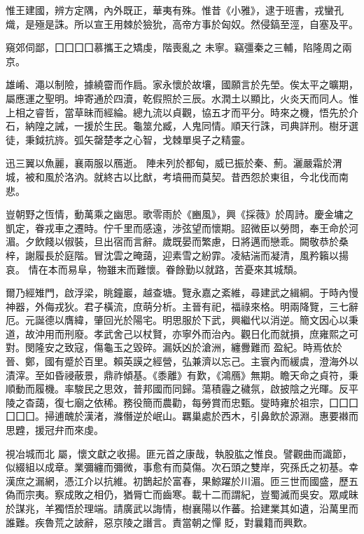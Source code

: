 \begin{pinyinscope}
 惟王建國，辨方定隅，內外既正，華夷有殊。惟昔《小雅》，逮于班書，戎蠻孔熾，是殛是誅。所以宣王用棘於獫狁，高帝方事於匈奴。然侵鎬至涇，自塞及平。



 窺郊伺鄙，囗囗囗囗慕攜王之矯虔，階喪亂之
 未寧。竊彊秦之三輔，陷隆周之兩京。



 雄崤、澠以制險，據繞霤而作扃。家永懷於故壤，國願言於先塋。俟太平之曠期，屬應運之聖明。坤寄通於四瀆，乾假照於三辰。水潤土以顯比，火炎天而同人。惟上相之睿哲，當草昧而經綸。總九流以貞觀，協五才而平分。時來之機，悟先於介石，納隍之誡，一援於生民。龜筮允臧，人鬼同情。順天行誅，司典詳刑。樹牙選徒，秉鉞抗旍。弧矢罄楚孝之心智，戈棘單吳子之精靈。



 迅三翼以魚麗，襄兩服以鴈逝。
 陣未列於都甸，威已振於秦、薊。灑嚴霜於渭城，被和風於洛汭。就終古以比猷，考墳冊而莫契。昔西怨於東徂，今北伐而南悲。



 豈朝野之恆情，動萬乘之幽思。歌零雨於《豳風》，興《採薇》於周詩。慶金墉之凱定，眷戎車之遷時。佇千里而感遠，涉弦望而懷期。詔微臣以勞問，奉王命於河湄。夕飲餞以俶裝，旦出宿而言辭。歲既晏而繁慮，日將邁而戀乖。闕敬恭於桑梓，謝履長於庭階。冒沈雲之晻藹，迎素雪之紛霏。凌結湍而凝清，風矜籟以揚哀。
 情在本而易阜，物雖末而難懷。眷餘勤以就路，苦憂來其城頹。



 爾乃經雉門，啟浮梁，眺鐘巖，越查塘。覽永嘉之紊維，尋建武之緝綱。于時內慢神器，外侮戎狄。君子橫流，庶萌分析。主晉有祀，福祿來格。明兩降覽，三七辭厄。元誕德以膺緯，肇回光於陽宅。明思服於下武，興繼代以消逆。簡文因心以秉道，故沖用而刑廢。孝武舍己以杖賢，亦寧外而治內。觀日化而就損，庶雍熙之可對。閔隆安之致寇，傷龜玉之毀碎。漏妖凶於滄洲，纏釁難而
 盈紀。時焉依於晉、鄭，國有蹙於百里。賴英謨之經營，弘兼濟以忘己。主寰內而緩虞，澄海外以漬滓。至如昏祲蔽景，鼎祚傾基。《黍離》有歎，《鴻鴈》無期。瞻天命之貞符，秉順動而履機。率駿民之思效，普邦國而同歸。蕩積霾之穢氛，啟披陰之光暉。反平陵之杳藹，復七廟之依稀。務役簡而農勸，每勞賞而忠甄。燮時雍於祖宗，囗囗囗囗囗囗。掃逋醜於漢渚，滌僭逆於岷山。羈巢處於西木，引鼻飲於源淵。惠要襋而思韙，援冠弁而來虔。



 視冶城而北
 屬，懷文獻之收揚。匪元首之康哉，執股肱之惟良。譬觀曲而識節，似綴組以成章。業彌纏而彌微，事愈有而莫傷。次石頭之雙岸，究孫氏之初基。幸漢庶之漏網，憑江介以抗維。初鵲起於富春，果鯨躍於川湄。匝三世而國盛，歷五偽而宗夷。察成敗之相仍，猶脣亡而齒寒。載十二而謂紀，豈蜀滅而吳安。眾咸昧於謀兆，羊獨悟於理端。請廣武以誨情，樹襄陽以作蕃。拾建業其如遺，沿萬里而誰難。疾魯荒之詖辭，惡京陵之譖言。責當朝之憚
 貶，對曩籍而興歎。




\end{pinyinscope}
